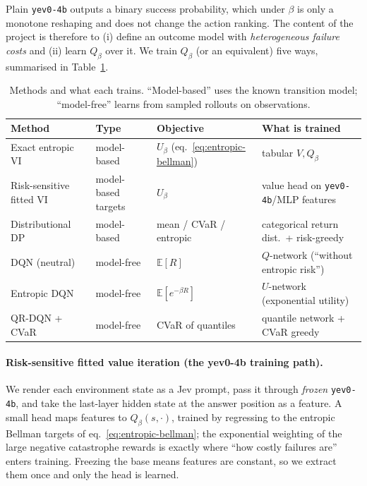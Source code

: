 \documentclass[11pt]{article}
\newcommand{\Ubeta}{U_{\beta}}
\newcommand{\E}{\mathbb{E}}
\begin{document}
Plain \texttt{yev0-4b} outputs a binary success probability, which under $\beta$ is
only a monotone reshaping and does not change the action ranking. The content of
the project is therefore to (i) define an outcome model with \emph{heterogeneous
failure costs} and (ii) learn $Q_\beta$ over it. We train $Q_\beta$ (or an
equivalent) five ways, summarised in Table~\ref{tab:methods}.

\begin{table}[H]\centering\small
\caption{Methods and what each trains. ``Model-based'' uses the known transition
model; ``model-free'' learns from sampled rollouts on observations.}
\label{tab:methods}
\begin{tabular}{@{}llll@{}}
\toprule
Method & Type & Objective & What is trained \\
\midrule
Exact entropic VI & model-based & $\Ubeta$ (eq.~\ref{eq:entropic-bellman}) & tabular $V,Q_\beta$ \\
Risk-sensitive fitted VI & model-based targets & $\Ubeta$ & value head on \texttt{yev0-4b}/MLP features \\
Distributional DP & model-based & mean / CVaR / entropic & categorical return dist.\ + risk-greedy \\
DQN (neutral) & model-free & $\E[R]$ & $Q$-network (``without entropic risk'') \\
Entropic DQN & model-free & $\E[e^{-\beta R}]$ & $U$-network (exponential utility) \\
QR-DQN + CVaR & model-free & CVaR of quantiles & quantile network + CVaR greedy \\
\bottomrule
\end{tabular}
\end{table}

\paragraph{Risk-sensitive fitted value iteration (the yev0-4b training path).}
We render each environment state as a Jev prompt, pass it through \emph{frozen}
\texttt{yev0-4b}, and take the last-layer hidden state at the answer position as a
feature. A small head maps features to $Q_\beta(s,\cdot)$, trained by regressing to
the entropic Bellman targets of eq.~\eqref{eq:entropic-bellman}; the exponential
weighting of the large negative catastrophe rewards is exactly where ``how costly
failures are'' enters training. Freezing the base means features are constant, so
we extract them once and only the head is learned.
\end{document}
